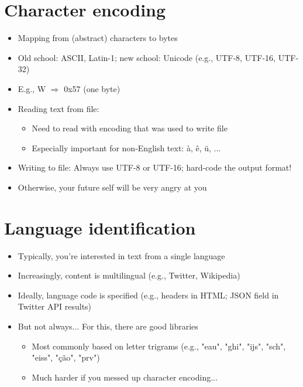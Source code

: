 \documentclass[11pt]{article}
\begin{document}
\section*{Character encoding}
\begin{itemize}
	\item Mapping from (abstract) characters to bytes
	\item Old school: ASCII, Latin-1; new school: Unicode (e.g., UTF-8, UTF-16, UTF-32)
	\item E.g., W $\Rightarrow$ 0x57 (one byte)
	\item Reading text from file:
		\begin{itemize}
			\item Need to read with encoding that was used to write file
			\item Especially important for non-English text: à, ê, ü, ...
		\end{itemize}
	\item Writing to file: Always use UTF-8 or UTF-16; hard-code the output format!
	\item Otherwise, your future self will be very angry at you
\end{itemize}

\section*{Language identification}
\begin{itemize}
	\item Typically, you're interested in text from a single language
	\item Increasingly, content is multilingual (e.g., Twitter, Wikipedia)
	\item Ideally, language code is specified (e.g., headers in HTML; JSON field in Twitter API results)
	\item But not always... For this, there are good libraries
		\begin{itemize}
			\item Most commonly based on letter trigrams (e.g., "eau", "ghi", "ijs", "sch", "eiss", "ção", "prv")
			\item Much harder if you messed up character encoding...
		\end{itemize}
\end{itemize}
\end{document}
